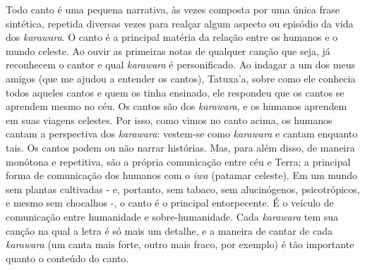 Todo canto é uma pequena narrativa, às vezes composta por uma única
frase sintética, repetida diversas vezes para realçar algum aspecto ou
episódio da vida dos \emph{karawara}. O canto é a principal matéria da
relação entre os humanos e o mundo celeste. Ao ouvir as primeiras notas
de qualquer canção que seja, já reconhecem o cantor e qual
\emph{karawara} é personificado. Ao indagar a um dos meus amigos (que me
ajudou a entender os cantos), Tatuxa'a, sobre como ele conhecia todos
aqueles cantos e quem os tinha ensinado, ele respondeu que os cantos se
aprendem mesmo no céu. Os cantos são dos \emph{karawara}, e os humanos
aprendem em suas viagens celestes. Por isso, como vimos no canto acima,
os humanos cantam a perspectiva dos \emph{karawara}: vestem-se como
\emph{karawara} e cantam enquanto tais. Os cantos podem ou não narrar
histórias. Mas, para além disso, de maneira monótona e repetitiva, são a
própria comunicação entre céu e Terra; a principal forma de comunicação
dos humanos com o \emph{iwa} (patamar celeste). Em um mundo sem plantas
cultivadas - e, portanto, sem tabaco, sem alucinógenos, psicotrópicos, e
mesmo sem chocalhos -, o canto é o principal entorpecente. É o veículo
de comunicação entre humanidade e sobre-humanidade. Cada \emph{karawara}
tem sua canção na qual a letra é só mais um detalhe, e a maneira de
cantar de cada \emph{karawara} (um canta mais forte, outro mais fraco,
por exemplo) é tão importante quanto o conteúdo do canto.

